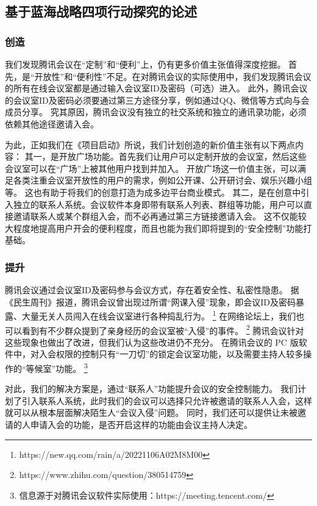 \documentclass[a4paper,12pt]{article}
\begin{document}
    \subsection{基于蓝海战略四项行动探究的论述}
    \subsubsection{创造}
    我们发现腾讯会议在“定制”和“便利”上，仍有更多价值主张值得深度挖掘。
    首先，是“开放性”和“便利性”不足。在对腾讯会议的实际使用中，我们发现腾讯会议的所有在线会议室都是通过输入会议室ID及密码（可选）进入。
    此外，腾讯会议的会议室ID及密码必须要通过第三方途径分享，例如通过QQ、微信等方式向与会成员分享。
    究其原因，腾讯会议没有独立的社交系统和独立的通讯录功能，必须依赖其他途径邀请入会。

    为此，正如我们在《项目启动》所说，我们计划创造的新价值主张有以下两点内容：
    其一，是开放广场功能。首先我们让用户可以定制开放的会议室，然后这些会议室可以在“广场”上被其他用户找到并加入。
    开放广场这一价值主张，可以满足各类注重会议室开放性的用户的需求，例如公开课、公开研讨会、娱乐兴趣小组等。
    这也有助于将我们的创意打造为成多边平台商业模式。
    其二，是在创意中引入独立的联系人系统。会议软件本身即带有联系人列表、群组等功能，用户可以直接邀请联系人或某个群组入会，而不必再通过第三方链接邀请入会。
    这不仅能较大程度地提高用户开会的便利程度，而且也能为我们即将提到的“安全控制”功能打基础。

    \subsubsection{提升}

    腾讯会议通过会议室ID及密码参与会议方式，存在着安全性、私密性隐患。
    据《民生周刊》报道，腾讯会议曾出现过所谓“网课入侵”现象，即会议ID及密码暴露、大量无关人员闯入在线会议室进行各种捣乱行为。
    \footnote{https://new.qq.com/rain/a/20221106A02M8M00}
    在网络论坛上，我们也可以看到有不少群众提到了亲身经历的会议室被“入侵”的事件。
    \footnote{https://www.zhihu.com/question/380514759}
    腾讯会议针对这些现象也做出了改进，但我们认为这些改进仍不充分。
    在腾讯会议的 PC 版软件中，对入会权限的控制只有“一刀切”的锁定会议室功能，以及需要主持人较多操作的“等候室”功能。
    \footnote{信息源于对腾讯会议软件实际使用：https://meeting.tencent.com/}

    对此，我们的解决方案是，通过“联系人”功能提升会议的安全控制能力。
    我们计划了引入联系人系统，此时我们的会议可以选择只允许被邀请的联系人入会，这样就可以从根本层面解决陌生人“会议入侵”问题。
    同时，我们还可以提供让未被邀请的人申请入会的功能，是否开启这样的功能由会议主持人决定。
\end{document}
